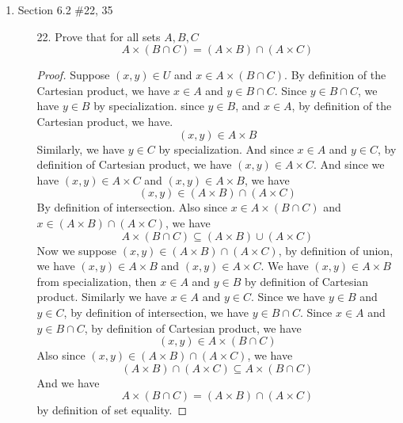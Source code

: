\documentclass[12pt]{article}
\newcommand{\paren}[1]{\left( #1 \right)}
\begin{document}
\begin{enumerate}
    \item Section 6.2 \#22, 35
        \begin{enumerate}
            \item[22.] Prove that for all sets $A,B,C$
                \[
                A \times \paren{B \cap C} = \paren{A \times B} \cap \paren{A \times C}
                \]
                \begin{proof}
                    Suppose $(x,y) \in U$ and $x \in A \times \paren{ B \cap C}$. By definition of the Cartesian product, we have $x \in A$ and $y \in B \cap C$. Since $y \in B \cap C$, we have $y \in B$ by specialization. since $y \in B$, and $x \in A$, by definition of the Cartesian product, we have.
                    \[
                    (x,y) \in A \times B
                    \]
                    Similarly, we have $y \in C$ by specialization. And since $x \in A$ and $y \in C$, by definition of Cartesian product, we have $\paren{x,y} \in A\times C$. And since we have $\paren{x,y} \in A\times C$ and $\paren{x,y} \in A\times B$, we have 
                    \[
                    (x,y) \in \paren{A \times B} \cap \paren{A \times C}
                    \]
                    By definition of intersection. Also since $x \in A \times \paren{B \cap C} $ and $ x \in \paren{A \times B} \cap \paren{A \times C}$, we have
                    \[
                    A \times \paren{B \cap C} \subseteq \paren{A \times B} \cup \paren{A \times C}
                    \]
                    Now we suppose $(x,y) \in \paren{A \times B} \cap \paren{A \times C}$, by definition of union, we have $(x,y) \in A \times B$ and $(x,y) \in A \times C$. We have $\paren{x,y} \in A \times B$ from specialization, then $x \in A$ and $y \in B$ by definition of Cartesian product. Similarly we have $x \in A$ and $y \in C$. Since we have $y \in B $ and $y \in C$, by definition of intersection, we have $y \in B \cap C$. Since $x \in A$ and $y \in B \cap C$, by definition of Cartesian product, we have
                    \[
                    (x,y) \in A \times \paren{B \cap C}
                    \]
                    Also since $(x,y) \in \paren{A \times B} \cap \paren{A \times C}$, we have
                    \[
                    \paren{A \times B} \cap \paren{A \times C} \subseteq  A \times \paren{B \cap C}
                    \]
                    And we have 
                    \[
                    A \times \paren{B \cap C} = \paren{A \times B} \cap \paren{A \times C}
                    \]
                    by definition of set equality. 
                \end{proof}


\end{enumerate}
\end{enumerate}
\end{document}
